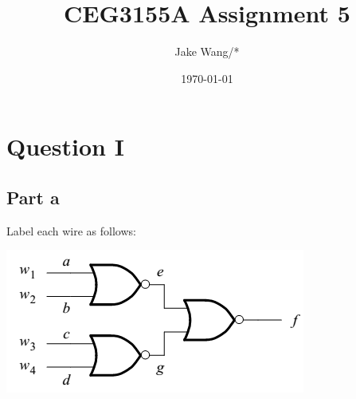\documentclass[12pt, a4paper]{article}
\title{CEG3155A Assignment 5}
\author{Jake Wang/*}
\date{\today}
\begin{document}
	\maketitle
	
	\section*{Question I}
	\subsection*{Part a}
	Label each wire as follows:
	
	\begin{center}
		\includegraphics[scale=0.5]{Q1a.png}
	\end{center}
	
\end{document}

